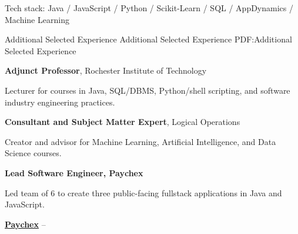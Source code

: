 \documentclass[MMMMyyyy,nonstopmode]{simpleresumecv_stacked}
\newcommand{\tech}[1]{\Gap Tech stack: #1}
\newcommand{\techsep}{/ }
\newif\ifLOCATION
\newif\ifLONG
\newif\ifNOTSELECTED
\begin{document}
\begin{Body}
\begin{Detail}
\tech{Java \techsep JavaScript \techsep Python \techsep Scikit-Learn \techsep SQL \techsep AppDynamics \techsep Machine Learning}
\fi

\end{Detail}

\BigGap

\Section
{Additional Selected Experience}
{Additional Selected Experience}
{PDF:Additional Selected Experience}

\Entry
\textbf{Adjunct Professor}, Rochester Institute of Technology

Lecturer for courses in Java, SQL/DBMS, Python/shell scripting, and software industry engineering practices.

\Gap
\Entry
\textbf{Consultant and Subject Matter Expert}, Logical Operations %

Creator and advisor for Machine Learning, Artificial Intelligence, and Data Science courses.


\ifLOCATION
\hfill
Rochester, New York
\fi



\ifNOTSELECTED
\Entry
\textbf{Lead Software Engineer, Paychex}
\hfill

\begin{Detail}
Led team of 6 to create three public-facing fullstack applications in Java and JavaScript.
\end{Detail}

\ifLONG

\Entry
\href{http://www.paychex.com/}
{\textbf{Paychex}}
\hfill 
 -- 


\end{Body}
\end{document}
